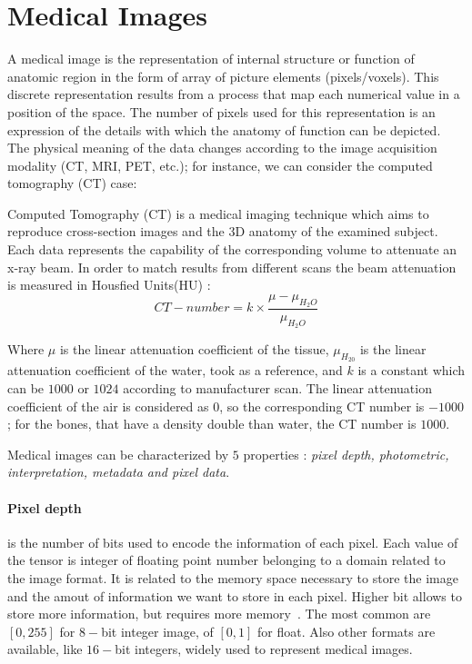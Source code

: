 \documentclass{standalone}
\begin{document}
	\section{Medical Images}
	
	A medical image is the representation of internal structure or function of anatomic region in the form of array of picture elements (pixels/voxels). 
	This discrete representation results from a process that map each numerical value in a position of the space. The number of pixels used for this representation is an expression of the details with which the anatomy of function can be depicted.  The physical meaning of the data changes according to the image acquisition modality (CT, MRI, PET, etc.); 	for instance, we can consider the computed tomography (CT) case: 
	
	 Computed Tomography (CT) is a medical imaging technique which aims to reproduce  cross-section images and the 3D anatomy of the examined subject. Each data represents the capability  of the corresponding volume to attenuate an x-ray beam. In order to match results from different scans the beam attenuation is measured in Housfied Units(HU) : 
	\begin{equation}\label{eq:HU}
		CT-number = k\times\frac{\mu - \mu_{H_2O}}{\mu_{H_2O}}
	\end{equation}
	
	Where $\mu$ is the linear attenuation coefficient of the tissue, $\mu_{H_20}$ is the linear attenuation coefficient of the water, took as a reference, and $k$ is a constant which can be $1000$ or $1024$ according to manufacturer scan. The linear attenuation coefficient of the air is considered as $0$, so the corresponding CT number is $-1000$; for the bones, that have a density double than water, the CT number is $1000$.
	
	Medical images can be characterized by $5$ properties : \emph{pixel depth, photometric, interpretation, metadata and pixel data}. 
	
	\paragraph*{Pixel depth} is the number of bits used to encode the information of each pixel. Each value of the tensor is integer of floating point number belonging to a domain related to the image format. It is related to the memory space necessary to store the image and the amout of information we want to store in each pixel. Higher bit allows to store more information, but requires more memory~\cite{ART:Larobina}. The most common are $[0, 255]$ for $8-$bit integer image, of $[0, 1]$ for float. Also other formats are available, like $16-$bit integers, widely used to represent medical images. 
	
\end{document}
